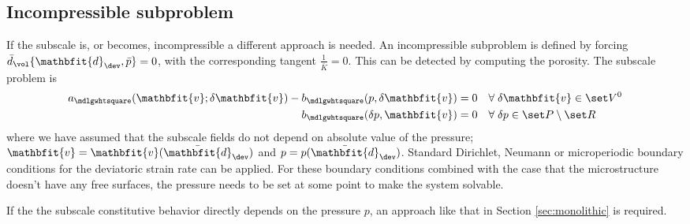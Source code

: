 \documentclass[a4paper,11pt]{article}
\renewcommand{\ta}[1]{\mathbfit{#1}}
\renewcommand{\ts}[1]{\mathbfit{#1}}
\renewcommand{\Box}{\mdlgwhtsquare}
\begin{document}
\subsection{Incompressible subproblem} \label{sec:nested_incompressible}
If the subscale is, or becomes, incompressible a different approach is needed.
An incompressible subproblem is defined by forcing $\bar{d}_\vol\{\ts d_\dev,\bar{p}\} = 0$, with the corresponding tangent $\frac{1}{\bar{K}} = 0$.
This can be detected by computing the porosity.
The subscale problem is
\begin{align}
 a_\Box(\ta v; \delta\ta v) - b_\Box(p,\delta\ta v) &= 0\quad \forall\;\delta\ta v \in \set V^0 \\
 b_\Box(\delta p, \ta v) &= 0\quad \forall\;\delta p \in \set P\setminus\set R
\end{align}
where we have assumed that the subscale fields do not depend on absolute value of the pressure; $\ta v = \ta v(\bar{\ts d}_\dev)$ and $p = p(\bar{\ts d}_\dev)$.
Standard Dirichlet, Neumann  or microperiodic boundary conditions for the deviatoric strain rate can be applied.
For these boundary conditions combined with the case that the microstructure doesn't have any free surfaces, 
the pressure needs to be set at some point to make the system solvable.

If the the subscale constitutive behavior directly depends on the pressure $p$, an approach like that in Section \ref{sec:monolithic} is required.
\end{document}
